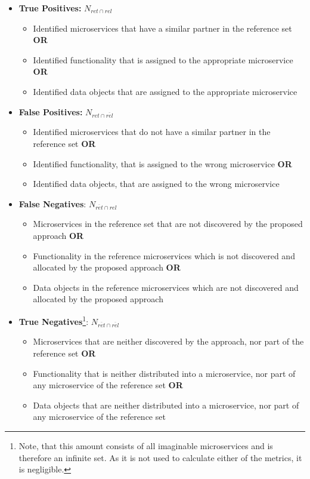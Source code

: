 \begin{itemize}
	\item \textbf{True Positives:}  $N_{ret\cap rel}$  
	
	\begin{itemize}
		\item Identified microservices that have a similar partner in the reference set \textbf{OR}
		\item Identified functionality that is assigned to the appropriate microservice \textbf{OR}
		\item Identified data objects that are assigned to the appropriate microservice
	\end{itemize}
	
	
	\item  \textbf{False Positives:}  $N_{ret\cap \overline{rel}}$ 
	\begin{itemize}
		\item Identified microservices that do not have a similar partner in the reference set \textbf{OR}
		\item Identified functionality, that is assigned to the wrong microservice  \textbf{OR}
		\item Identified data objects, that are assigned to the wrong microservice
	\end{itemize}
	
	\item \textbf{False Negatives}:  $N_{\overline{ret}\cap rel}$ 
		\begin{itemize}
		\item Microservices in the reference set that are not discovered by the proposed approach  \textbf{OR}
		\item Functionality in the reference microservices which is not discovered and allocated by the proposed approach  \textbf{OR}
		\item Data objects in the reference microservices which are not discovered and allocated by the proposed approach
	\end{itemize}
	
	\item \textbf{True Negatives}\footnote{Note, that this amount consists of all imaginable microservices and is therefore an infinite set. As it is not used to calculate either of the metrics, it is negligible. }: $N_{\overline{ret}\cap \overline{rel}}$
	 	\begin{itemize}
	 	\item  Microservices that are neither discovered by the approach, nor part of the reference set   \textbf{OR}
	 	\item Functionality that is neither distributed into a microservice, nor part of any microservice of the reference set  \textbf{OR}
	 	\item Data objects that are neither distributed into a microservice, nor part of any microservice of the reference set
	 \end{itemize}
	
	
	
\end{itemize}



